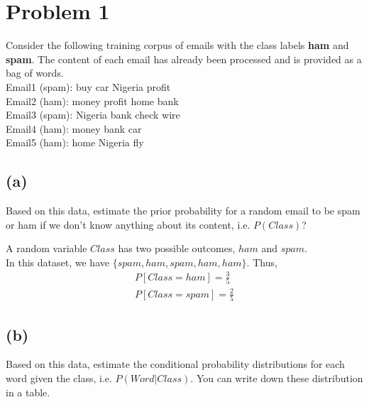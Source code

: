 \documentclass[twoside,11pt]{homework}
\date{\today} %
\begin{document}
\maketitle

\section*{Problem 1}

Consider the following training corpus of emails with the class labels
\textbf{ham} and \textbf{spam}. The content of each email has already been
processed and is provided as a bag of words.\\
Email1 (spam): buy car Nigeria profit\\
Email2 (ham): money profit home bank\\
Email3 (spam): Nigeria bank check wire\\
Email4 (ham): money bank car\\
Email5 (ham): home Nigeria fly

\subsection*{(a)}

\begin{prob}
  Based on this data, estimate the prior probability for a random email to be
  spam or ham if we don't know anything about its content, i.e. $P(Class)$?
\end{prob}

\begin{solution}
  A random variable $Class$ has two possible outcomes, $ham$ and $spam$.\\
  In this dataset, we have $\{ spam, ham, spam, ham, ham \}$.
  Thus,
  \[
    \begin{aligned}
      P[Class = ham] = \frac{3}{5}\\
      P[Class = spam] = \frac{2}{5}
    \end{aligned}
  \]
\end{solution}

\subsection*{(b)}

\begin{prob}
  Based on this data, estimate the conditional probability distributions for
  each word given the class, i.e. $P(Word | Class)$.
  You can write down these distribution in a table.
\end{prob}
\end{document}
